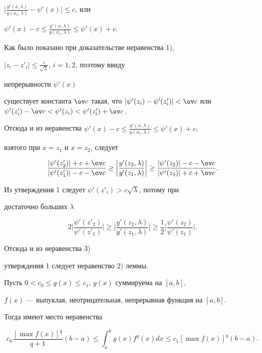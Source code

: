 \begin{pf}
$\big|\frac{y'(x,\lambda)}{y(x_1,\lambda)}-\psi'(x)\big|{\le} c$, или 


$\psi'(x)-c\le \frac{y'(x,\lambda)}{y(x_1,\lambda)}\le \psi'(x)+c$. 


 


Как было показано при доказательстве неравенства 1), 


$|z_i-z'_i|\le\frac{c}{\sqrt{\lambda}}$, $i=1,2$, поэтому ввиду 


непрерывности $\psi'(x)$ 


существует константа $\ov c$ такая, что $|\psi'(z_i)-\psi'(z'_i)|<\ov 


c$ или $\psi'(z'_i)-\ov c<\psi'(z_i)<\psi'(z'_i)+\ov c$. 


Отсюда и из неравенства $\psi'(x)-c\le 


\frac{y'(x,\lambda)}{y(x_1,\lambda)}\le\psi'(x)+c$, 


взятого при $x=z_1$ и $x=z_2$, следует 


$$ 


\frac{|\psi'(z'_2)|+c+\ov c}{|\psi'(z'_1)|-c-\ov c}\ge\bigg| 


\frac{y'(z_2,\lambda)}{y'(z_1,\lambda)}\bigg|\ge 


\frac{|\psi'(z_2)|-c-\ov c}{|\psi'(z_1)|+c+\ov c}. 


$$ 


Из утверждения 1 следует $\psi'(z'_i)>c\sqrt{\lambda}$, потому при 


достаточно больших $\lambda$ 


$$ 


2\bigg|\frac{\psi'(z'_2)}{\psi'(z'_1)}\bigg|\ge \bigg| 


\frac{y'(z_2,\lambda)}{y'(z_1,\lambda)}\bigg|\ge\frac{1}{2} 


\bigg|\frac{\psi'(z_2)}{\psi'(z_1)}\bigg|. 


$$ 


Отсюда и из неравенства 3) 


утверждения 1 следует неравенство 2) леммы. 


\end{pf} 


 


\begin{assrt} 


Пусть $0<c_0\le g(x)\le c_1$, $g(x)$ суммируема на $[a,b]$, 


$f(x)$ --- выпуклая, неотрицательная, непрерывная функция на $[a,b]$. 


Тогда имеют место неравенства 


$$ 


c_0\frac{[\max f(x)]^q}{q+1}(b-a)\le\int^b_a 


g(x)f^q(x)dx\le c_1[\max f(x)]^q(b-a). 


$$ 


\end{assrt} 


